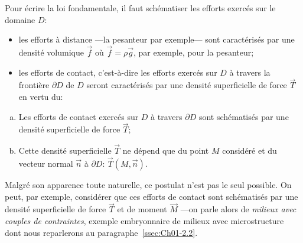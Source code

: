 Pour écrire la loi fondamentale, il faut schématiser les efforts exercés sur le domaine $D$:
\begin{itemize}
    \item les efforts à distance ---la pesanteur par exemple--- sont caractérisés par une densité volumique $\vec{f}$ où $\vec{f}=\rho \vec{g}$, par exemple, pour la pesanteur;
    \item les efforts de contact, c'est-à-dire les efforts exercés sur $D$ à travers la frontière $\partial D$ de $D$ seront caractérisés par une densité superficielle de force $\vec{T}$ en vertu du:
\end{itemize}

\begin{Postulat}
    \begin{enumerate}[(a)]
        \item Les efforts de contact exercés sur $D$ à travers $\partial D$ sont schématisés par une densité superficielle de force $\vec{T}$;
        \item Cette densité superficielle $\vec{T}$ ne dépend que du point $M$ considéré et du vecteur normal $\vec{n}$ à $\partial D$: $\vec{T}(M,\vec{n})$.
    \end{enumerate}
\end{Postulat}

Malgré son apparence toute naturelle, ce postulat n'est pas le seul possible.
On peut, par exemple, considérer que ces efforts de contact sont schématisés par une densité superficielle de force $\vec{T}$ et de moment $\vec{M}$ ---on parle alors de \emph{milieux avec couples de contraintes}, exemple embryonnaire de milieux avec microstructure dont nous reparlerons au paragraphe~\ref{ssec:Ch01-2.2}.

